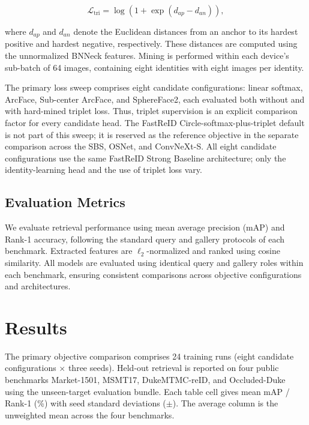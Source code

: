 \documentclass{llncs}
\begin{document}
\begin{equation}
\mathcal{L}_{\mathrm{tri}}
=
\log\left(1+\exp(d_{ap}-d_{an})\right),
\end{equation}

where $d_{ap}$ and $d_{an}$ denote the Euclidean distances from an anchor to its hardest positive and hardest negative, respectively. These distances are computed using the unnormalized BNNeck features. Mining is performed within each device's sub-batch of 64 images, containing eight identities with eight images per identity.

The primary loss sweep comprises eight candidate configurations: linear softmax, ArcFace, Sub-center ArcFace, and SphereFace2, each evaluated both without and with hard-mined triplet loss. Thus, triplet supervision is an explicit comparison factor for every candidate head. The FastReID Circle-softmax-plus-triplet default is not part of this sweep; it is reserved as the reference objective in the separate comparison across the SBS, OSNet, and ConvNeXt-S. All eight candidate configurations use the same FastReID Strong Baseline architecture; only the identity-learning head and the use of triplet loss vary.


\subsection{Evaluation Metrics}
\label{sec:metrics}

We evaluate retrieval performance using mean average precision (mAP) and Rank-1 accuracy, following the standard query and gallery protocols of each benchmark. Extracted features are $\ell_2$-normalized and ranked using cosine similarity. All models are evaluated using identical query and gallery roles within each benchmark, ensuring consistent comparisons across objective configurations and architectures.



\section{Results}
\label{sec:results}

The primary objective comparison comprises 24 training runs (eight candidate configurations $\times$ three seeds). Held-out retrieval is reported on four public benchmarks Market-1501, MSMT17, DukeMTMC-reID, and Occluded-Duke using the unseen-target evaluation bundle. Each table cell gives mean mAP / Rank-1 (\%) with seed standard deviations ($\pm$). The average column is the unweighted mean across the four benchmarks.
\end{document}

